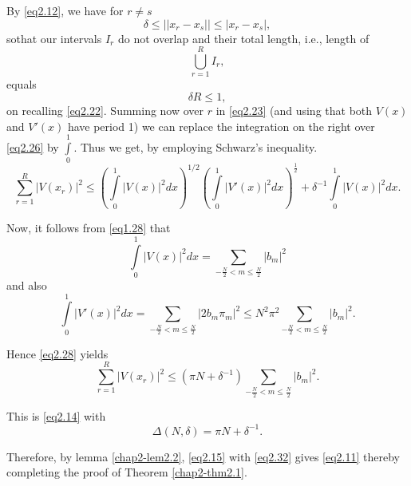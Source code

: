 By \eqref{eq2.12}, we have for $r \neq s$
\begin{equation*}
\delta \leq || x_r -x_s || \leq |x_r - x_s|, \tag{2.25}\label{eq2.25}
\end{equation*}
so\pageoriginale that our intervals $I_r$ do not overlap and their
total length, i.e., length of  
\begin{equation*}
\bigcup_{r=1}^R I_r, \tag{2.26}\label{eq2.26}
\end{equation*}
equals
\begin{equation*}
\delta R \leq 1, \tag{2.27}\label{eq2.27}
\end{equation*}
on recalling \eqref{eq2.22}. Summing now over $r$ in \eqref{eq2.23}
(and using that both $V(x)$ and $V'(x)$ have period 1) we can replace the
integration on the right over \eqref{eq2.26} by $\int\limits_{0}^1$. 
Thus we get, by employing Schwarz's inequality.
\begin{equation*}
\sum_{r=1}^R |V(x_r)|^2 \leq ( \int\limits_{0}^1 |V(x)|^2 dx)^{1/2}
(\int\limits_{0}^1 |V'(x)|^2 dx)^{\frac{1}{2}} + \delta^{-1}
\int\limits_{0}^1 |V(x)|^2 dx. \tag{2.28}\label{eq2.28} 
\end{equation*} 

Now, it follows from \eqref{eq1.28} that 
\begin{equation*}
\int\limits_{0}^1 |V(x)|^2 dx = \sum_{- \frac{N}{2}< m \leq
  \frac{N}{2}} |b_m|^2 \tag{2.29}\label{eq2.29} 
\end{equation*}
and also
\begin{equation*}
\int\limits_{0}^1 |V'(x)|^2 dx =\sum_{- \frac{N}{2}< m \le
  \frac{N}{2}} |2b_m \pi_m|^2 \le N^2 \pi^2 \sum_{- \frac{N}{2}< m \le
  \frac{N}{2}}|b_m|^2. \tag{2.30}\label{eq2.30} 
\end{equation*}

Hence \eqref{eq2.28} yields
\begin{equation*}
\sum_{r=1}^R|V(x_r)|^2 \le (\pi N+ \delta^{-1} )\sum_{- \frac{N}{2}< m
  \le \frac{N}{2}}|b_m|^2. \tag{2.31}\label{eq2.31} 
\end{equation*}

This is \eqref{eq2.14} with 
\begin{equation*}
\Delta (N, \delta) = \pi N + \delta^{-1}. \tag{2.32}\label{eq2.32}
\end{equation*}

Therefore, by lemma \ref{chap2-lem2.2}, \eqref{eq2.15} with
\eqref{eq2.32} gives \eqref{eq2.11} thereby 
completing the proof of Theorem \ref{chap2-thm2.1}. 

